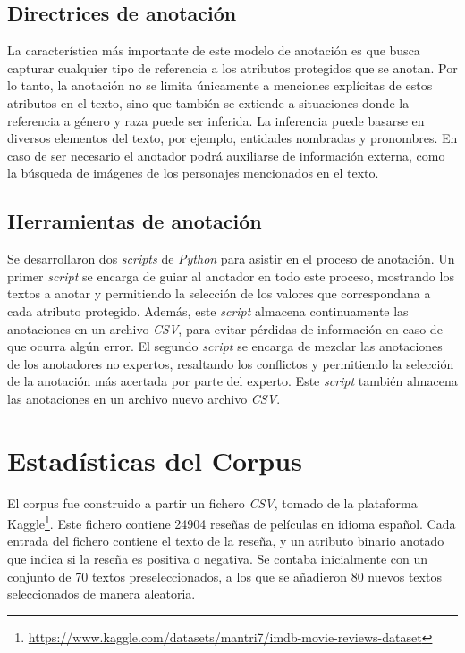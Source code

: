 \subsection{Directrices de anotaci\'on}
La caracter\'istica m\'as importante de este modelo de anotaci\'on es que busca capturar cualquier tipo de referencia a los atributos 
protegidos que se anotan. Por lo tanto, la anotaci\'on no se limita \'unicamente a menciones expl\'icitas de estos atributos en el 
texto, sino que tambi\'en se extiende a situaciones donde la referencia a g\'enero y raza puede ser inferida. La inferencia puede 
basarse en diversos elementos del texto, por ejemplo, entidades nombradas y pronombres. En caso de ser necesario el anotador podr\'a
auxiliarse de informaci\'on externa, como la b\'usqueda de im\'agenes de los personajes mencionados en el texto.

\subsection{Herramientas de anotaci\'on}
Se desarrollaron dos \emph{scripts} de \emph{Python} para asistir en el proceso de anotaci\'on. Un primer \emph{script}
se encarga de guiar al anotador en todo este proceso, mostrando los textos a anotar y permitiendo la selecci\'on de los valores
que correspondana a cada atributo protegido. Adem\'as, este \emph{script} almacena continuamente las anotaciones en un archivo
\emph{CSV}, para evitar p\'erdidas de informaci\'on en caso de que ocurra alg\'un error. El segundo \emph{script} se encarga de
mezclar las anotaciones de los anotadores no expertos, resaltando los conflictos y permitiendo la selecci\'on de la anotaci\'on
m\'as acertada por parte del experto. Este \emph{script} tambi\'en almacena las anotaciones en un archivo nuevo archivo
\emph{CSV}.

\section{Estad\'isticas del Corpus}
El corpus fue construido a partir un fichero \emph{CSV}, tomado de la plataforma 
Kaggle\footnote{\url{https://www.kaggle.com/datasets/mantri7/imdb-movie-reviews-dataset}}. 
Este fichero contiene 24904 rese\~nas de pel\'iculas en idioma espa\~nol. Cada entrada del fichero contiene el texto de la rese\~na, 
y un atributo binario anotado que indica si la rese\~na es positiva o negativa. Se contaba inicialmente con un conjunto de 70 textos 
preseleccionados, a los que se a\~nadieron 80 nuevos textos seleccionados de manera aleatoria.

